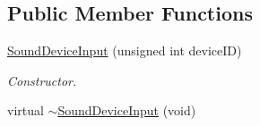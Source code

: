 \subsection*{Public Member Functions}
\begin{DoxyCompactItemize}
\item 
\hyperlink{class_sound_device_input_a8596aae39978b111db4942a5ff441e0f}{SoundDeviceInput} (unsigned int deviceID)
\begin{DoxyCompactList}\small\item\em Constructor. \item\end{DoxyCompactList}\item 
\hypertarget{class_sound_device_input_ab2b031837b9f84ab2004091ed6e0c0b1}{
virtual \hyperlink{class_sound_device_input_ab2b031837b9f84ab2004091ed6e0c0b1}{$\sim$SoundDeviceInput} (void)}
\label{class_sound_device_input_ab2b031837b9f84ab2004091ed6e0c0b1}


\end{DoxyCompactItemize}
